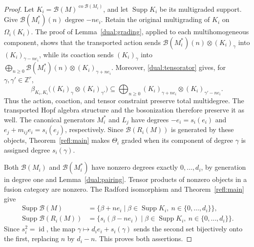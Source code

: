 \documentclass[11pt, a4paper]{article}
\numberwithin{equation}{section}
\newcommand{\B}{\mathcal B}
\DeclareMathOperator{\id}{id}
\DeclareMathOperator{\co}{co}
\begin{document}
\begin{proof}
 Let $K_i=\B(M)^{\co\B(M_i)}$, and let ${\operatorname{Supp}K_i}$ be its
multigraded support. Give $\B(M_i^*)(n)$ degree $-ne_i$.
{Retain the original multigrading of $K_i$ on
$\Omega_i(K_i)$. The proof of Lemma~\ref{dual:grading},
applied to each multihomogeneous component, shows that the
transported action sends
$\B(M_i^*)(n)\otimes(K_i)_\gamma$ into
$(K_i)_{\gamma-ne_i}$, while its coaction sends
$(K_i)_\gamma$ into
$\bigoplus_{n\geq0}\B(M_i^*)(n)\otimes(K_i)_{\gamma+ne_i}$.
Moreover, \eqref{dual:tensorator} gives, for
$\gamma,\gamma'\in\mathbb Z^r$,}
\[
 {
 \beta_{K_i,K_i}\bigl((K_i)_\gamma\otimes(K_i)_{\gamma'}\bigr)
 \subseteq\bigoplus_{n\geq0}
 (K_i)_{\gamma+ne_i}\otimes(K_i)_{\gamma'-ne_i}.}
\]
{Thus the action, coaction, and tensor constraint
preserve total multidegree. The transported Hopf algebra
structure and the bosonization therefore preserve it as well.
The canonical generators $M_i^*$ and $L_j$ have degrees
$-e_i=s_i(e_i)$ and $e_j+m_{ij}e_i=s_i(e_j)$, respectively.
Since $\B(R_i(M))$ is generated by these objects,
Theorem~\ref{refl:main} makes $\Theta_i$ graded when its 
component of degree $\gamma$ is assigned degree $s_i(\gamma)$.}

Both $\B(M_i)$ and $\B(M_i^*)$ have nonzero degrees exactly
$0,\ldots,d_i$, by generation in degree one and
Lemma~\ref{dual:pairing}.
Tensor products of nonzero objects in a fusion category
are nonzero. The Radford isomorphism and
Theorem~\ref{refl:main} give
\[
\begin{aligned}
 {\operatorname{Supp}\B(M)}
 &=\{\beta+ne_i\mid
       \beta\in {\operatorname{Supp}K_i},\ n\in\{0,\ldots,d_i\}\},\\
 {\operatorname{Supp}\B(R_i(M))}
 &=\{s_i(\beta-ne_i)\mid
       \beta\in {\operatorname{Supp}K_i},\ n\in\{0,\ldots,d_i\}\}.
\end{aligned}
\]
Since $s_i^2=\id$, the map
$\gamma\mapsto d_i e_i+s_i(\gamma)$ sends the second set
bijectively onto the first, replacing $n$ by $d_i-n$.
This proves both assertions.
\end{proof}
\end{document}
